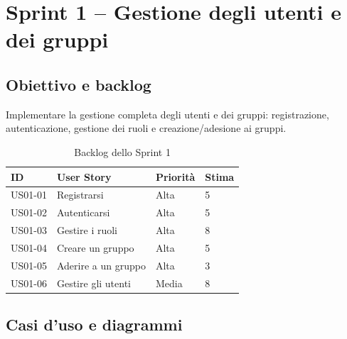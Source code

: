 \section{Sprint 1 -- Gestione degli utenti e dei gruppi}
\label{sec:sprint1}

\subsection{Obiettivo e backlog}
\label{subsec:sprint1-obiettivo}

Implementare la gestione completa degli utenti e dei gruppi: registrazione, autenticazione, gestione dei ruoli e creazione/adesione ai gruppi.

\begin{table}[H]
    \centering
    \caption{Backlog dello Sprint 1}
    \label{tab:sprint1-backlog}
    \renewcommand{\arraystretch}{1.3}
    \begin{tabular}{|p{1.8cm}|p{7cm}|p{2.5cm}|p{1.5cm}|}
        \hline
        \textbf{ID} & \textbf{User Story} & \textbf{Priorità} & \textbf{Stima} \\
        \hline
        US01-01 & Registrarsi & Alta & 5 \\
        \hline
        US01-02 & Autenticarsi & Alta & 5 \\
        \hline
        US01-03 & Gestire i ruoli & Alta & 8 \\
        \hline
        US01-04 & Creare un gruppo & Alta & 5 \\
        \hline
        US01-05 & Aderire a un gruppo & Alta & 3 \\
        \hline
        US01-06 & Gestire gli utenti & Media & 8 \\
        \hline
    \end{tabular}
\end{table}

\subsection{Casi d'uso e diagrammi}
\label{subsec:sprint1-casi-uso}

